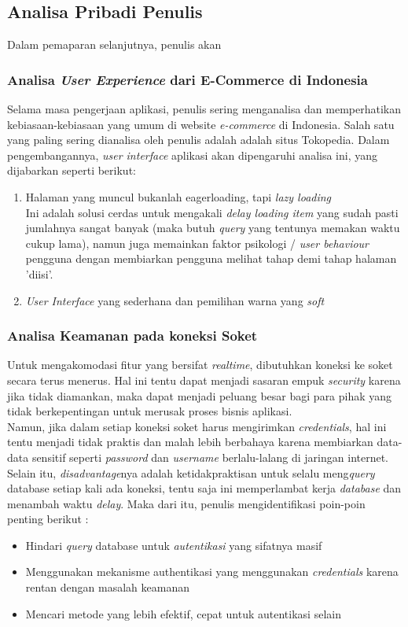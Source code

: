 
\subsection{Analisa Pribadi Penulis}
	Dalam pemaparan selanjutnya, penulis akan 
	\subsubsection{Analisa \textit{User Experience} dari E-Commerce di Indonesia}
	\label{alasan-ux-ecommerce-indonesia alasan-app-serupa}
	Selama masa pengerjaan aplikasi, penulis sering menganalisa dan memperhatikan kebiasaan-kebiasaan yang umum di website \textit{e-commerce} di Indonesia. Salah satu yang paling sering dianalisa oleh penulis adalah adalah situs Tokopedia. Dalam pengembangannya, \textit{user interface} aplikasi akan dipengaruhi analisa ini, yang dijabarkan seperti berikut:
	\begin{enumerate}
		\item Halaman yang muncul bukanlah eagerloading, tapi \textit{lazy loading}\\
		\indent Ini adalah solusi cerdas untuk mengakali \textit{delay loading item} yang sudah pasti jumlahnya sangat banyak (maka butuh \textit{query} yang tentunya memakan waktu cukup lama), namun juga memainkan faktor psikologi / \textit{user behaviour} pengguna dengan membiarkan pengguna melihat tahap demi tahap halaman 'diisi'.
		\item \textit{User Interface} yang sederhana dan pemilihan warna yang \textit{soft}
	\end{enumerate}
	
	\subsubsection{Analisa Keamanan pada koneksi Soket}
	\label{alasan-socket.io}
	Untuk mengakomodasi fitur yang bersifat \textit{realtime}, dibutuhkan koneksi ke soket secara terus menerus. Hal ini tentu dapat menjadi sasaran empuk \textit{security} karena jika tidak diamankan, maka dapat menjadi peluang besar bagi para pihak yang tidak berkepentingan untuk merusak proses bisnis aplikasi.\\
	\indent Namun, jika dalam setiap koneksi soket harus mengirimkan \textit{credentials}, hal ini tentu menjadi tidak praktis dan malah lebih berbahaya karena membiarkan data-data sensitif seperti \textit{password} dan \textit{username} berlalu-lalang di jaringan internet. Selain itu, \textit{disadvantage}nya adalah ketidakpraktisan untuk selalu meng\textit{query} database setiap kali ada koneksi, tentu saja ini memperlambat kerja \textit{database} dan menambah waktu \textit{delay}. Maka dari itu, penulis mengidentifikasi poin-poin penting berikut :
		\begin{itemize}
			\item Hindari \textit{query} database untuk \textit{autentikasi} yang sifatnya masif
			\item Menggunakan mekanisme authentikasi yang menggunakan \textit{credentials} karena rentan dengan masalah keamanan
			\item Mencari metode yang lebih efektif, cepat untuk autentikasi selain 
		\end{itemize}
	
